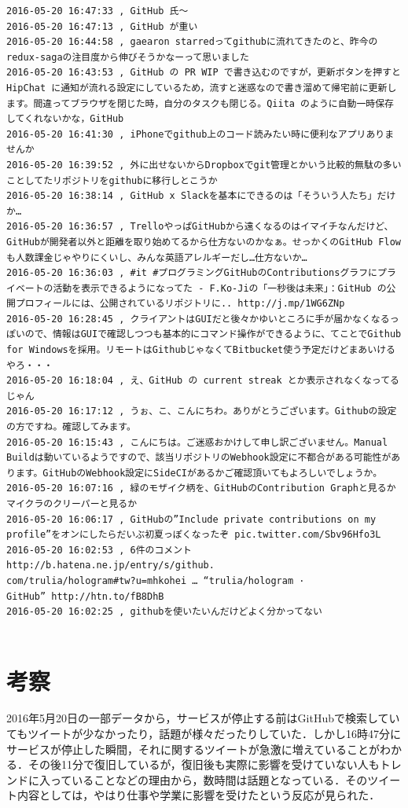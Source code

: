\begin{verbatim}
2016-05-20 16:47:33 , GitHub 氏〜
2016-05-20 16:47:13 , GitHub が重い
2016-05-20 16:44:58 , gaearon starredってgithubに流れてきたのと、昨今のredux-sagaの注目度から伸びそうかなーって思いました
2016-05-20 16:43:53 , GitHub の PR WIP で書き込むのですが，更新ボタンを押すと HipChat に通知が流れる設定にしているため，流すと迷惑なので書き溜めて帰宅前に更新します。間違ってブラウザを閉じた時，自分のタスクも閉じる。Qiita のように自動一時保存してくれないかな，GitHub
2016-05-20 16:41:30 , iPhoneでgithub上のコード読みたい時に便利なアプリありませんか
2016-05-20 16:39:52 , 外に出せないからDropboxでgit管理とかいう比較的無駄の多いことしてたリポジトリをgithubに移行しとこうか
2016-05-20 16:38:14 , GitHub x Slackを基本にできるのは「そういう人たち」だけか…
2016-05-20 16:36:57 , TrelloやっぱGitHubから遠くなるのはイマイチなんだけど、GitHubが開発者以外と距離を取り始めてるから仕方ないのかなぁ。せっかくのGitHub Flowも人数課金じゃやりにくいし、みんな英語アレルギーだし…仕方ないか…
2016-05-20 16:36:03 , #it #プログラミングGitHubのContributionsグラフにプライベートの活動を表示できるようになってた - F.Ko-Jiの「一秒後は未来」：GitHub の公開プロフィールには、公開されているリポジトリに.. http://j.mp/1WG6ZNp 
2016-05-20 16:28:45 , クライアントはGUIだと後々かゆいところに手が届かなくなるっぽいので、情報はGUIで確認しつつも基本的にコマンド操作ができるように、てことでGithub for Windowsを採用。リモートはGithubじゃなくてBitbucket使う予定だけどまあいけるやろ・・・
2016-05-20 16:18:04 , え、GitHub の current streak とか表示されなくなってるじゃん
2016-05-20 16:17:12 , うぉ、こ、こんにちわ。ありがとうございます。Githubの設定の方ですね。確認してみます。
2016-05-20 16:15:43 , こんにちは。ご迷惑おかけして申し訳ございません。Manual Buildは動いているようですので、該当リポジトリのWebhook設定に不都合がある可能性があります。GitHubのWebhook設定にSideCIがあるかご確認頂いてもよろしいでしょうか。
2016-05-20 16:07:16 , 緑のモザイク柄を、GitHubのContribution Graphと見るかマイクラのクリーパーと見るか
2016-05-20 16:06:17 , GitHubの”Include private contributions on my profile”をオンにしたらだいぶ初夏っぽくなったぞ pic.twitter.com/Sbv96Hfo3L
2016-05-20 16:02:53 , 6件のコメント http://b.hatena.ne.jp/entry/s/github.
com/trulia/hologram#tw?u=mhkohei … “trulia/hologram · 
GitHub” http://htn.to/fB8DhB 
2016-05-20 16:02:25 , githubを使いたいんだけどよく分かってない


\end{verbatim}

\chapter{考察}
2016年5月20日の一部データから，サービスが停止する前はGitHubで検索していてもツイートが少なかったり，話題が様々だったりしていた．しかし16時47分にサービスが停止した瞬間，それに関するツイートが急激に増えていることがわかる．その後11分で復旧しているが，復旧後も実際に影響を受けていない人もトレンドに入っていることなどの理由から，数時間は話題となっている．そのツイート内容としては，やはり仕事や学業に影響を受けたという反応が見られた．

